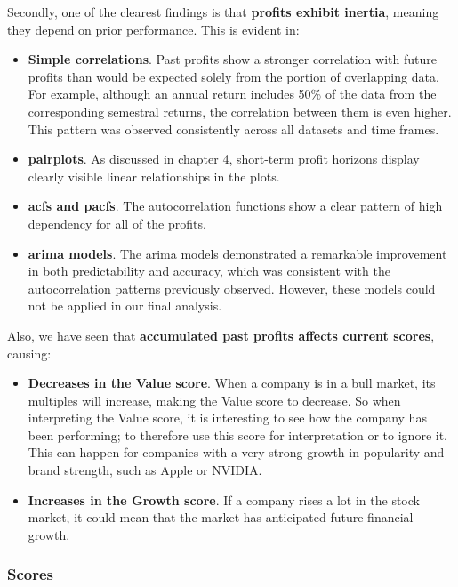 \documentclass[11pt,english,a4paper,hidelinks]{book}
\begin{document}
\noindent Secondly, one of the clearest findings is that \textbf{profits exhibit inertia}, meaning they depend on prior performance. This is evident in:
\begin{itemize}
    \item \textbf{Simple correlations}. Past profits show a stronger correlation with future profits than would be expected solely from the portion of overlapping data. For example, although an annual return includes 50\% of the data from the corresponding semestral returns, the correlation between them is even higher. This pattern was observed consistently across all datasets and time frames.
    \item \textbf{\acrshort{pairplot}s}. As discussed in chapter 4, short-term profit horizons display clearly visible linear relationships in the plots.
    \item \textbf{\acrshort{acf}s and \acrshort{pacf}s}. The autocorrelation functions show a clear pattern of high dependency for all of the profits.
    \item \textbf{\acrshort{arima} models}. The \acrshort{arima} models demonstrated a remarkable improvement in both predictability and accuracy, which was consistent with the autocorrelation patterns previously observed. However, these models could not be applied in our final analysis.
\end{itemize}

\noindent Also, we have seen that \textbf{accumulated past profits affects current scores}, causing:
\begin{itemize}
    \item \textbf{Decreases in the Value score}. When a company is in a bull market, its multiples will increase, making the Value score to decrease. So when interpreting the Value score, it is interesting to see how the company has been performing; to therefore use this score for interpretation or to ignore it. This can happen for companies with a very strong growth in popularity and brand strength, such as Apple or NVIDIA.
    \item \textbf{Increases in the Growth score}. If a company rises a lot in the stock market, it could mean that the market has anticipated future financial growth.
\end{itemize}


\subsubsection{Scores}
\end{document}
